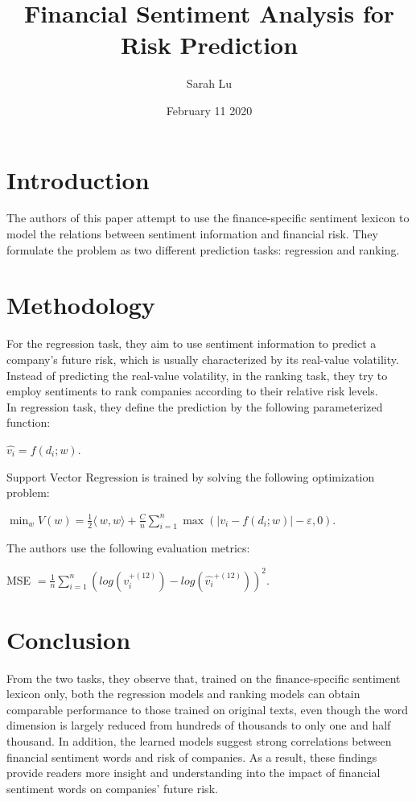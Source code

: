 \documentclass{article}
\title{Financial Sentiment Analysis for Risk Prediction}
\author{Sarah Lu }
\date{February 11 2020}
\begin{document}
\maketitle

\section{Introduction}
The authors of this paper attempt to use the finance-specific sentiment lexicon to model the relations between sentiment information and financial risk. They formulate the problem as two different prediction tasks: regression and ranking. 

\section{Methodology}
For the regression task, they aim to use sentiment information to predict a company’s future risk, which is usually characterized by its real-value volatility. Instead of predicting the real-value volatility, in the ranking task, they try to employ sentiments to rank companies according to their relative risk levels.\\ 
In regression task, they define the prediction by the following parameterized function:
\begin{center}
$\widehat{v_i} = f(d_i;w)  $.
\end{center}
Support Vector Regression is trained by solving the following optimization problem:
\begin{center}
$\min_{w} V(w) = \frac{1}{2}\langle\ w,w\rangle + \frac{C}{n}\sum_{i=1}^{n} \max(|v_{i}-f(d_i;w)|-\varepsilon,0)$.
\end{center}
The authors use the following evaluation metrics:
\begin{center}
MSE $= \frac{1}{n}\sum_{i=1}^{n}(log(v_i^{+(12)})-log(\widehat{v_i}^{+(12)}))^{2}$.
\end{center}

\section{Conclusion}
From the two tasks, they observe that, trained on the finance-specific sentiment lexicon only, both the regression models and ranking models can obtain comparable performance to those trained on original texts, even though the word dimension is largely reduced from hundreds of thousands to only one and half thousand. In addition, the learned models suggest strong correlations between financial sentiment words and risk of companies. As a result, these findings provide readers more insight and understanding into the impact of financial sentiment words on companies’ future risk.
\end{document}
